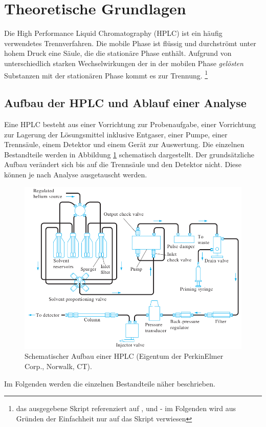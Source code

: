 \section{Theoretische Grundlagen}
  
  Die High Performance Liquid Chromatography (HPLC) ist ein häufig verwendetes Trennverfahren. Die mobile Phase ist flüssig und durchströmt unter hohem Druck eine Säule, die die stationäre Phase enthält. Aufgrund von unterschiedlich starken Wechselwirkungen der in der mobilen Phase \textit{gelösten} Substanzen mit der stationären Phase kommt es zur Trennung. \citep{SkriptHPLC}\footnote{das ausgegebene Skript referenziert auf \citep{QuantitativeAnalyseHarris}, \citep{InstrumentelleAnalytikSkoog} und \citep{ModernLiquidChromatography} - im Folgenden wird aus Gründen der Einfachheit nur auf das Skript verwiesen}
  
  \subsection{Aufbau der HPLC und Ablauf einer Analyse}
    
    Eine HPLC besteht aus einer Vorrichtung zur Probenaufgabe, einer Vorrichtung zur Lagerung der Lösungsmittel inklusive Entgaser, einer Pumpe, einer Trennsäule, einem Detektor und einem Gerät zur Auswertung. Die einzelnen Bestandteile werden in Abbildung \ref{fig:AufbauHPLC} schematisch dargestellt. Der grundsätzliche Aufbau verändert sich bis auf die Trennsäule und den Detektor nicht. Diese können je nach Analyse ausgetauscht werden. 
    
      \begin{figure}[H]
        \includegraphics[scale=0.3, center]{images/PartsOfHPLC.png} 
        \caption[Schematischer Aufbau einer HPLC (Eigentum der PerkinElmer Corp., Norwalk, CT), Quelle: ]{Schematischer Aufbau einer HPLC (Eigentum der PerkinElmer Corp., Norwalk, CT).}
        \label{fig:AufbauHPLC}
      \end{figure}
    Im Folgenden werden die einzelnen Bestandteile näher beschrieben.
      
